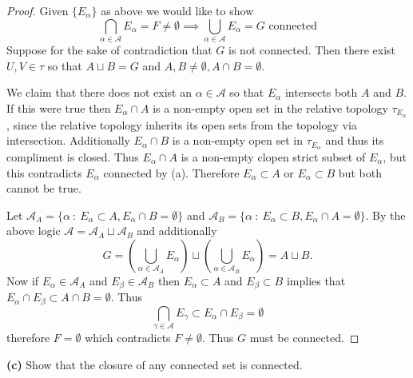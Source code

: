 \documentclass[11pt]{amsart}
\theoremstyle{definition}
\numberwithin{theorem}{section}
\numberwithin{definition}{section}
\numberwithin{equation}{section}
\def\scripta{{\mathcal A}}
\begin{document}
\begin{proof}
	Given $\{E_\alpha\}$ as above we would like to show
	\begin{equation*}
		\bigcap_{\alpha \in \scripta} E_\alpha = F \neq \emptyset \implies \bigcup_{\alpha \in \scripta} E_\alpha = G \text{ connected}
	\end{equation*}
	Suppose for the sake of contradiction that $G$ is not connected. Then there exist $U, V \in \tau$ so that $A \sqcup B = G$ and $A,B \neq \emptyset,A \cap B = \emptyset.$

	 We claim that there does not exist an $\alpha \in \scripta$ so that $E_\alpha$ intersects both  $A$ and $B$.  If this were true then $E_\alpha \cap A$ is a non-empty open set in the relative topology $\tau_{E_\alpha}$, since the relative topology inherits its open sets from the topology via intersection. Additionally $E_\alpha \cap B$ is a non-empty open set in $\tau_{E_\alpha}$ and thus its compliment is closed. Thus $E_\alpha \cap A$ is a non-empty clopen strict subset of $E_\alpha$, but this contradicts $E_\alpha$ connected by (a). Therefore $E_\alpha \subset A$ or $E_\alpha \subset B$ but both cannot be true.

	 Let $\scripta_A = \{\alpha\ :\ E_\alpha \subset A, E_\alpha \cap B =\emptyset\}$ and $\scripta_B = \{\alpha\ :\ E_\alpha \subset B, E_\alpha \cap A = \emptyset\}$. By the above logic $\scripta = \scripta_A \sqcup \scripta_B$ and additionally
	 \begin{equation*}
	 	G = \left(\bigcup_{\alpha\in\scripta_A} E_\alpha\right) \sqcup \left(\bigcup_{\alpha \in \scripta_B} E_\alpha \right) = A \sqcup B.
	 \end{equation*}
	 Now if $E_\alpha \in \scripta_A$ and $E_\beta \in \scripta_B$ then $E_\alpha \subset A$ and $E_\beta \subset B$ implies that $E_\alpha \cap E_\beta \subset A \cap B = \emptyset.$ Thus \begin{equation*}
	 	\bigcap_{\gamma \in \scripta} E_\gamma \subset E_\alpha \cap E_\beta = \emptyset
	 \end{equation*}
	 therefore $F = \emptyset$ which contradicts $F \neq \emptyset.$ Thus $G$ must be connected.
\end{proof}
\noindent \textbf{(c)} Show that the closure of any connected set is connected.
\end{document}
